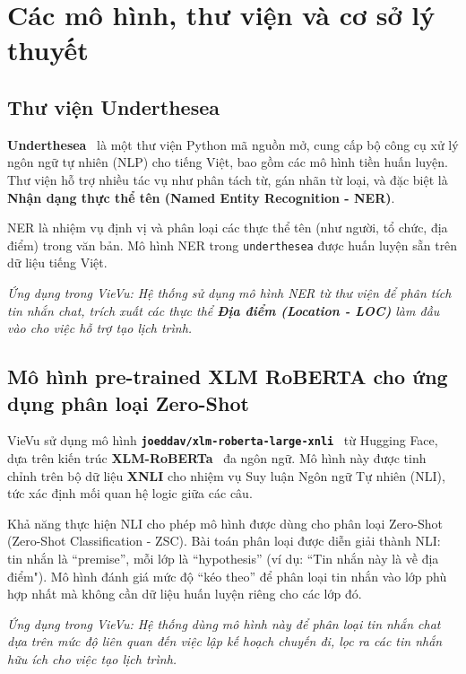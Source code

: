 \section{Các mô hình, thư viện và cơ sở lý thuyết}
\label{sec:fundamental_knowledge}
\subsection{Thư viện Underthesea}

\textbf{Underthesea}~\cite{underthesea_lib} là một thư viện Python mã nguồn mở, cung cấp bộ công cụ xử lý ngôn ngữ tự nhiên (NLP) cho tiếng Việt, bao gồm các mô hình tiền huấn luyện. Thư viện hỗ trợ nhiều tác vụ như phân tách từ, gán nhãn từ loại, và đặc biệt là \textbf{Nhận dạng thực thể tên (Named Entity Recognition - NER)}.

NER là nhiệm vụ định vị và phân loại các thực thể tên (như người, tổ chức, địa điểm) trong văn bản. Mô hình NER trong \texttt{underthesea} được huấn luyện sẵn trên dữ liệu tiếng Việt.

\textit{Ứng dụng trong VieVu: Hệ thống sử dụng mô hình NER từ thư viện để phân tích tin nhắn chat, trích xuất các thực thể \textbf{Địa điểm (Location - LOC)} làm đầu vào cho việc hỗ trợ tạo lịch trình.}

\subsection{Mô hình pre-trained XLM RoBERTA cho ứng dụng phân loại Zero-Shot}

VieVu sử dụng mô hình \textbf{\texttt{joeddav/xlm-roberta-large-xnli}}~\cite{xlm_roberta_xnli_model} từ Hugging Face, dựa trên kiến trúc \textbf{XLM-RoBERTa}~\cite{xlm_roberta_paper} đa ngôn ngữ. Mô hình này được tinh chỉnh trên bộ dữ liệu \textbf{XNLI} cho nhiệm vụ Suy luận Ngôn ngữ Tự nhiên (NLI), tức xác định mối quan hệ logic giữa các câu.

Khả năng thực hiện NLI cho phép mô hình được dùng cho phân loại Zero-Shot (Zero-Shot Classification - ZSC). Bài toán phân loại được diễn giải thành NLI: tin nhắn là ``premise'', mỗi lớp là ``hypothesis'' (ví dụ: ``Tin nhắn này là về địa điểm"). Mô hình đánh giá mức độ ``kéo theo'' để phân loại tin nhắn vào lớp phù hợp nhất mà không cần dữ liệu huấn luyện riêng cho các lớp đó.

\textit{Ứng dụng trong VieVu: Hệ thống dùng mô hình này để phân loại tin nhắn chat dựa trên mức độ liên quan đến việc lập kế hoạch chuyến đi, lọc ra các tin nhắn hữu ích cho việc tạo lịch trình.}


